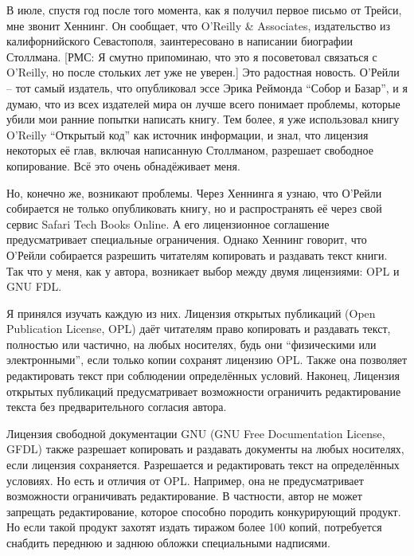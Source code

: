 В июле, спустя год после того момента, как я получил первое письмо от Трейси, мне звонит Хеннинг. Он сообщает, что O'Reilly \& Associates, издательство из калифорнийского Севастополя, заинтересовано в написании биографии Столлмана. [РМС: Я смутно припоминаю, что это я посоветовал связаться с O'Reilly, но после стольких лет уже не уверен.] Это радостная новость. О'Рейли -- тот самый издатель, что опубликовал эссе Эрика Реймонда \enquote{Собор и Базар}, и я думаю, что из всех издателей мира он лучше всего понимает проблемы, которые убили мои ранние попытки написать книгу. Тем более, я уже использовал книгу O'Reilly \enquote{Открытый код} как источник информации, и знал, что лицензия некоторых её глав, включая написанную Столлманом, разрешает свободное копирование. Всё это очень обнадёживает меня.

Но, конечно же, возникают проблемы. Через Хеннинга я узнаю, что О'Рейли собирается не только опубликовать книгу, но и распространять её через свой сервис Safari Tech Books Online. А его лицензионное соглашение предусматривает специальные ограничения.  Однако Хеннинг говорит, что О'Рейли собирается разрешить читателям копировать и раздавать текст книги. Так что у меня, как у автора, возникает выбор между двумя лицензиями: OPL и GNU FDL.

Я принялся изучать каждую из них. Лицензия открытых публикаций (Open Publication License, OPL)  даёт читателям право копировать и раздавать текст, полностью или частично, на любых носителях, будь они \enquote{физическими или электронными}, если только копии сохранят лицензию OPL. Также она позволяет редактировать текст при соблюдении определённых условий. Наконец, Лицензия открытых публикаций предусматривает возможности ограничить редактирование текста без предварительного согласия автора.

Лицензия свободной документации GNU (GNU Free Documentation License, GFDL) также разрешает копировать и раздавать документы на любых носителях, если лицензия сохраняется.  Разрешается и редактировать текст на определённых условиях. Но есть и отличия от OPL. Например, она не предусматривает возможности ограничивать редактирование. В частности, автор не может запрещать редактирование, которое способно породить конкурирующий продукт. Но если такой продукт захотят издать тиражом более 100 копий, потребуется снабдить переднюю и заднюю обложки специальными надписями.

